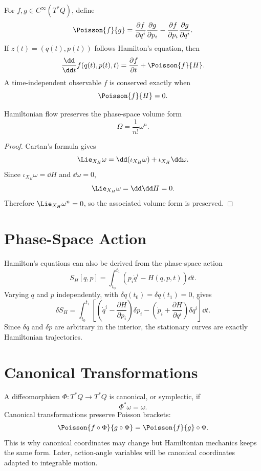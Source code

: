 For \(f,g\in C^\infty(T^*Q)\), define
\[
  \Poisson{f}{g}
  =
  \frac{\partial f}{\partial q^i}
  \frac{\partial g}{\partial p_i}
  -
  \frac{\partial f}{\partial p_i}
  \frac{\partial g}{\partial q^i}.
\]
If \(z(t)=(q(t),p(t))\) follows Hamilton's equation, then
\[
  \frac{\dd}{\dd t}f(q(t),p(t),t)
  =
  \frac{\partial f}{\partial t}+\Poisson{f}{H}.
\]
A time-independent observable \(f\) is conserved exactly when
\[
  \Poisson{f}{H}=0.
\]

\begin{proposition}
Hamiltonian flow preserves the phase-space volume form
\[
  \Omega=\frac{1}{n!}\omega^n.
\]
\end{proposition}

\begin{proof}
Cartan's formula gives
\[
  \Lie_{X_H}\omega=\dd(\iota_{X_H}\omega)+\iota_{X_H}\dd\omega.
\]
Since \(\iota_{X_H}\omega=\dd H\) and \(\dd\omega=0\),
\[
  \Lie_{X_H}\omega=\dd\dd H=0.
\]
Therefore \(\Lie_{X_H}\omega^n=0\), so the associated volume form is preserved.
\end{proof}

\section{Phase-Space Action}
\label{sec:phase-space-action}

Hamilton's equations can also be derived from the phase-space action
\[
  S_H[q,p]=\int_{t_0}^{t_1}\left(p_i\dot q^i-H(q,p,t)\right)\dd t.
\]
Varying \(q\) and \(p\) independently, with \(\delta q(t_0)=\delta q(t_1)=0\),
gives
\[
  \delta S_H
  =
  \int_{t_0}^{t_1}
  \left[
    \left(\dot q^i-\frac{\partial H}{\partial p_i}\right)\delta p_i
    -
    \left(\dot p_i+\frac{\partial H}{\partial q^i}\right)\delta q^i
  \right]\dd t.
\]
Since \(\delta q\) and \(\delta p\) are arbitrary in the interior, the
stationary curves are exactly Hamiltonian trajectories.

\section{Canonical Transformations}
\label{sec:canonical-transformations}

A diffeomorphism \(\Phi:T^*Q\to T^*Q\) is canonical, or symplectic, if
\[
  \Phi^*\omega=\omega.
\]
Canonical transformations preserve Poisson brackets:
\[
  \Poisson{f\circ\Phi}{g\circ\Phi}
  =
  \Poisson{f}{g}\circ\Phi.
\]
This is why canonical coordinates may change but Hamiltonian mechanics keeps
the same form. Later, action-angle variables will be canonical coordinates
adapted to integrable motion.

